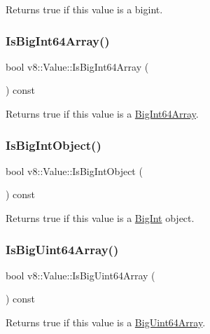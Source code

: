 Returns true if this value is a bigint. \mbox{\label{classv8_1_1Value_a2a4c67e98ddf7b09060e226130f25fda}} 
\subsubsection{\texorpdfstring{Is\+Big\+Int64\+Array()}{IsBigInt64Array()}}
{\footnotesize\ttfamily bool v8\+::\+Value\+::\+Is\+Big\+Int64\+Array (\begin{DoxyParamCaption}{ }\end{DoxyParamCaption}) const}

Returns true if this value is a \mbox{\hyperlink{classv8_1_1BigInt64Array}{Big\+Int64\+Array}}. \mbox{\label{classv8_1_1Value_a33927dad98e669f53f2fed83d68a24a6}} 
\subsubsection{\texorpdfstring{Is\+Big\+Int\+Object()}{IsBigIntObject()}}
{\footnotesize\ttfamily bool v8\+::\+Value\+::\+Is\+Big\+Int\+Object (\begin{DoxyParamCaption}{ }\end{DoxyParamCaption}) const}

Returns true if this value is a \mbox{\hyperlink{classv8_1_1BigInt}{Big\+Int}} object. \mbox{\label{classv8_1_1Value_a8a65d3cc71eebd50fa5cdc02fa2198f0}} 
\subsubsection{\texorpdfstring{Is\+Big\+Uint64\+Array()}{IsBigUint64Array()}}
{\footnotesize\ttfamily bool v8\+::\+Value\+::\+Is\+Big\+Uint64\+Array (\begin{DoxyParamCaption}{ }\end{DoxyParamCaption}) const}

Returns true if this value is a \mbox{\hyperlink{classv8_1_1BigUint64Array}{Big\+Uint64\+Array}}. \mbox{\label{classv8_1_1Value_a7ab7130b87a1fbcced76268353fae00b}} 
